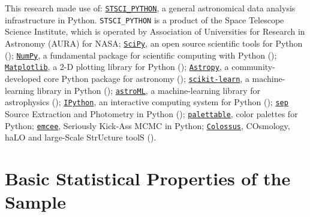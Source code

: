 \documentclass[fleqn,usenatbib]{mnras}
\begin{document}
  This research made use of:
  \href{http://www.stsci.edu/institute/software_hardware/pyraf/stsci\_python}
  {\texttt{\small{STSCI\_PYTHON}}},
      a general astronomical data analysis infrastructure in Python. 
      \texttt{\small{STSCI\_PYTHON}} is a product of the Space Telescope Science
      Institute, which is operated by Association of Universities for Research 
      in Astronomy (AURA) for NASA;
  \href{http://www.scipy.org/}{\texttt{SciPy}},
      an open source scientific tools for Python (\citealt{SciPy});
  \href{http://www.numpy.org/}{\texttt{NumPy}}, 
      a fundamental package for scientific computing with Python (\citealt{NumPy});
  \href{http://matplotlib.org/}{\texttt{Matplotlib}}, 
      a 2-D plotting library for Python (\citealt{Matplotlib});
  \href{http://www.astropy.org/}{\texttt{Astropy}}, a community-developed 
      core Python package for astronomy (\citealt{AstroPy}); 
  \href{http://scikit-learn.org/stable/index.html}{\texttt{scikit-learn}},
      a machine-learning library in Python (\citealt{scikit-learn}); 
  \href{http://www.astroml.org/}{\texttt{astroML}}, 
      a machine-learning library for astrophysics (\citealt{astroML});
  \href{https://ipython.org}{\texttt{IPython}}, 
      an interactive computing system for Python (\citealt{IPython});
  \href{https://github.com/kbarbary/sep}{\texttt{sep}} 
      Source Extraction and Photometry in Python (\citealt{PythonSEP});
  \href{https://jiffyclub.github.io/palettable/}{\texttt{palettable}},
      color palettes for Python;
  \href{http://dan.iel.fm/emcee/current/}{\texttt{emcee}}, 
      Seriously Kick-Ass MCMC in Python;
  \href{http://bdiemer.bitbucket.org/}{\texttt{Colossus}}, 
      COsmology, haLO and large-Scale StrUcture toolS (\citealt{Colossus}).






\appendix
   
\section{Basic Statistical Properties of the Sample} 
	\label{app:basic} 
\end{document}

